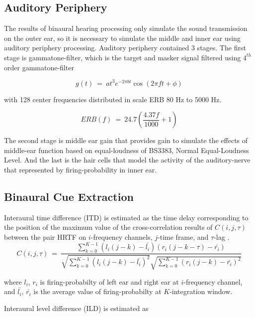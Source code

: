 \documentclass[a4paper]{jpconf}
\begin{document}
\subsection{Auditory Periphery}
The results of binaural hearing processing only simulate the sound transmission on the outer ear, so it is necessary to simulate the middle and inner ear using auditory periphery processing. Auditory periphery contained 3 stages. The first stage is gammatone-filter, which is the target and masker signal filtered using $4^{th}$order gammatone-filter 

\begin{equation}\label{pers:gammatone}
g(t) ~=~ at^{3}e^{-2\pi bt}\cos(2 \pi ft + \phi)
\end{equation}

with 128 center frequencies distributed in scale ERB 80 Hz to 5000 Hz\cite{roman2002}.

\begin{equation}\label{pers:erb}
ERB(f) ~=~ 24.7 \left( \frac{4.37 f}{1000} + 1\right)
\end{equation}

The second stage is middle ear gain that provides gain to simulate the effects of middle-ear function based on equal-loudness of BS3383, Normal Equal-Loudness Level. And the last is the hair cells that model the activity of the auditory-nerve that represented by firing-probability in inner ear\cite{meddis1986}.

\subsection{Binaural Cue Extraction}
Interaural time difference (ITD) is estimated as the time delay corresponding to the position of the maximum value of the cross-correlation results of $C(i, j, \tau)$ between the pair HRTF on $i$-frequency channels, $j$-time frame, and $\tau$-lag \cite{jeffress1948}.
\begin{equation}\label{pers:itd}
C(i, j, \tau) ~=~ \frac{\sum_{k=0}^{K-1}(l_i(j-k)-\bar{l_i})(r_i(j-k-\tau)-\bar{r_i})}{\sqrt{\sum_{k=0}^{K-1}(l_i(j-k)-\bar{l_i})^2}\sqrt{\sum_{k=0}^{K-1}(r_i(j-k)-\bar{r_i})^2}}
\end{equation}

where $l_i$, $r_i$ is firing-probabilty of left ear and right ear at $i$-frequency channel, and $\bar{l_i}$, $\bar{r_i}$ is the average value of firing-probabilty at $K$-integration window.

Interaural level difference (ILD) is estimated as
\end{document}
